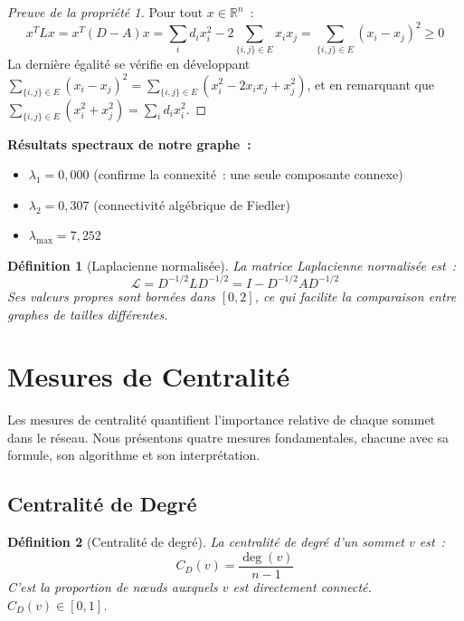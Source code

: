 \documentclass[12pt,a4paper]{article}
\newtheorem{definition}{Définition}[section]
\begin{document}
\begin{proof}[Preuve de la propriété 1]
Pour tout $x \in \mathbb{R}^n$~:
\[
    x^T L x = x^T (D - A) x = \sum_{i} d_i x_i^2 - 2 \sum_{\{i,j\} \in E} x_i x_j = \sum_{\{i,j\} \in E} (x_i - x_j)^2 \geq 0
\]
La dernière égalité se vérifie en développant $\sum_{\{i,j\} \in E} (x_i - x_j)^2 = \sum_{\{i,j\} \in E} (x_i^2 - 2x_i x_j + x_j^2)$, et en remarquant que $\sum_{\{i,j\} \in E} (x_i^2 + x_j^2) = \sum_i d_i x_i^2$.
\end{proof}

\noindent \textbf{Résultats spectraux de notre graphe~:}
\begin{itemize}
    \item $\lambda_1 = 0{,}000$ (confirme la connexité~: une seule composante connexe)
    \item $\lambda_2 = 0{,}307$ (connectivité algébrique de Fiedler)
    \item $\lambda_{\max} = 7{,}252$
\end{itemize}

\begin{definition}[Laplacienne normalisée]
La \emph{matrice Laplacienne normalisée} est~:
\[
    \mathcal{L} = D^{-1/2} L D^{-1/2} = I - D^{-1/2} A D^{-1/2}
\]
Ses valeurs propres sont bornées dans $[0, 2]$, ce qui facilite la comparaison entre graphes de tailles différentes.
\end{definition}

\section{Mesures de Centralité}
\label{sec:centralites}

Les mesures de centralité quantifient l'importance relative de chaque sommet dans le réseau. Nous présentons quatre mesures fondamentales, chacune avec sa formule, son algorithme et son interprétation.

\subsection{Centralité de Degré}

\begin{definition}[Centralité de degré]
La \emph{centralité de degré} d'un sommet $v$ est~:
\[
    C_D(v) = \frac{\deg(v)}{n - 1}
\]
C'est la proportion de n\oe{}uds auxquels $v$ est directement connecté. $C_D(v) \in [0, 1]$.
\end{definition}
\end{document}
